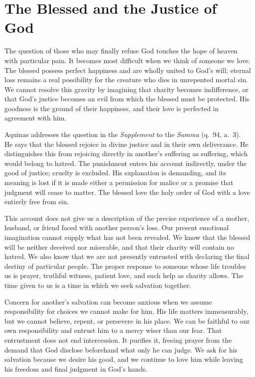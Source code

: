 \section{The Blessed and the Justice of God}

The question of those who may finally refuse God touches the hope of heaven with particular pain. It becomes most difficult when we think of someone we love. The blessed possess perfect happiness and are wholly united to God's will; eternal loss remains a real possibility for the creature who dies in unrepented mortal sin. We cannot resolve this gravity by imagining that charity becomes indifference, or that God's justice becomes an evil from which the blessed must be protected. His goodness is the ground of their happiness, and their love is perfected in agreement with him.

Aquinas addresses the question in the \emph{Supplement} to the \emph{Summa} (q.~94, a.~3). He says that the blessed rejoice in divine justice and in their own deliverance. He distinguishes this from rejoicing directly in another's suffering as suffering, which would belong to hatred. The punishment enters his account indirectly, under the good of justice; cruelty is excluded. His explanation is demanding, and its meaning is lost if it is made either a permission for malice or a promise that judgment will cease to matter. The blessed love the holy order of God with a love entirely free from sin.

This account does not give us a description of the precise experience of a mother, husband, or friend faced with another person's loss. Our present emotional imagination cannot supply what has not been revealed. We know that the blessed will be neither deceived nor miserable, and that their charity will contain no hatred. We also know that we are not presently entrusted with declaring the final destiny of particular people. The proper response to someone whose life troubles us is prayer, truthful witness, patient love, and such help as charity allows. The time given to us is a time in which we seek salvation together.

Concern for another's salvation can become anxious when we assume responsibility for choices we cannot make for him. His life matters immeasurably, but we cannot believe, repent, or persevere in his place. We can be faithful to our own responsibility and entrust him to a mercy wiser than our fear. That entrustment does not end intercession. It purifies it, freeing prayer from the demand that God disclose beforehand what only he can judge. We ask for his salvation because we desire his good, and we continue to love him while leaving his freedom and final judgment in God's hands.

